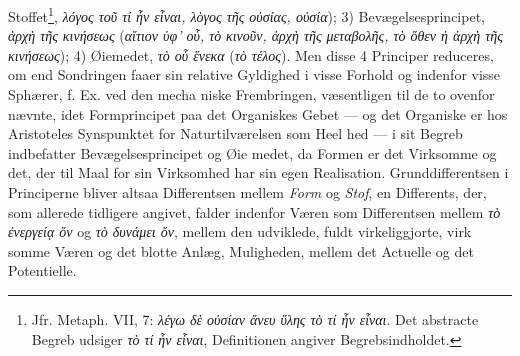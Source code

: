 \documentclass[12pt,a4paper]{book}
\newcommand{\gk}[1]{\textit{#1}}
\begin{document}
Stoffet\footnote{Jfr. Metaph. VII, 7: \gk{λέγω δὲ οὐσίαν ἄνευ ὕλης τὸ τί ἦν εἶναι}. Det abstracte Begreb udsiger \gk{τὸ τί ἦν εἶναι}, Definitionen angiver Begrebsindholdet.}, \gk{λόγος τοῦ τί ἦν εἶναι, λὸγος τῆς οὐσίας, οὐσία});
3) Bevægelsesprincipet, \emph{\gk{ἀρχὴ τῆς κινήσεως}} (\gk{αἴτιον ὑφ' οὗ, τὸ}
\gk{κινοῦν, ἀρχὴ τῆς μεταβολῆς, τὸ ὅθεν ἡ ἀρχὴ τῆς κινήσεως});
4) Øiemedet, \emph{\gk{τὸ οὗ ἕνεκα}} (\gk{τὸ τέλος}). Men disse 4 Principer
reduceres, om end Sondringen faaer sin relative Gyldighed i
visse Forhold og indenfor visse Sphærer, f. Ex. ved den mecha\-%
niske Frembringen, væsentligen til de to ovenfor nævnte, idet
Formprincipet paa det Organiskes Gebet --- og det Organiske
er hos Aristoteles Synspunktet for Naturtilværelsen som Heel\-%
hed --- i sit Begreb indbefatter Bevægelsesprincipet og Øie\-%
medet, da Formen er det Virksomme og det, der til Maal for
sin Virksomhed har sin egen Realisation. Grunddifferentsen
i Principerne bliver altsaa Differentsen mellem \emph{Form} og
\emph{Stof}, en Differents, der, som allerede tidligere angivet, falder
indenfor Væren som Differentsen mellem \gk{τὸ ἐνεργείᾳ ὄν} og
\gk{τὸ δυνάμει ὄν}, mellem den udviklede, fuldt virkeliggjorte, virk\-%
somme Væren og det blotte Anlæg, Muligheden, mellem det
Actuelle og det Potentielle.
\end{document}
